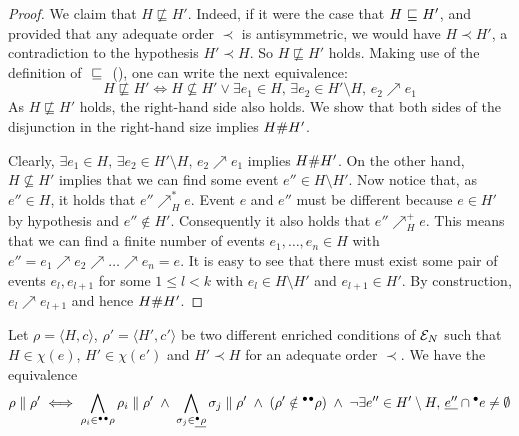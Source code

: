 \begin{proof}
We claim that $H \not\sqsubseteq H'$.  Indeed, if it were the case that $H
{\ \sqsubseteq \ } H'$, and provided that any adequate order $\prec$ is antisymmetric, we
would have $H \prec H'$, a contradiction to the hypothesis $H' \prec H$.  So $H
\not\sqsubseteq H'$ holds.  Making use of the definition of ${\ \sqsubseteq \ }$
(), one can write the next equivalence: $$H \not\sqsubseteq
H' \iff H \not\subseteq H' \lor \exists e_1 \in H,\, \exists e_2 \in H'
\setminus H,\, e_2 \nearrow e_1$$  As $H \not\sqsubseteq H'$ holds, the
right-hand side also holds.  We show that both sides of the disjunction in the
right-hand size implies $H \mathord{\#} H'$.

Clearly, $\exists e_1 \in H,\, \exists e_2 \in H' \setminus H,\, e_2 \nearrow
e_1$ implies $H \mathord{\#} H'$.  On the other hand, $H \not\subseteq H'$ implies
that we can find some event $e'' \in H \setminus H'$.  Now notice that, as $e''
\in H$, it holds that $e'' \nearrow^*_H e$.  Event $e$ and $e''$ must be
different because $e \in H'$ by hypothesis and $e'' \notin H'$.  Consequently
it also holds that $e'' \nearrow^+_H e$.  This means that we can find a finite
number of events $e_1, \ldots, e_n \in H$ with $e'' = e_1 \nearrow e_2 \nearrow
\ldots \nearrow e_n = e$.  It is easy to see that there must exist some pair of
events $e_l, e_{l+1}$ for some $1 \le l < k$ with $e_l \in H \setminus H'$ and
$e_{l+1} \in H'$.  By construction, $e_l \nearrow e_{l+1}$ and hence $H \mathord{\#}
H'$.
\end{proof}

\setcounter{theorem}{16}
\begin{theorem}
Let $\rho = \langle H, c \rangle$, $\rho' = \langle H', c' \rangle$ be two
different enriched conditions of $\mathcal{E}_{N}$ such that $H \in \chi(e)$, $H' \in
\chi(e')$ and $H' \prec H$ for an adequate order $\prec$.  We have the
equivalence $$\rho \parallel \rho' \iff \bigwedge_{\rho_i \in {}^\bullet{}^\bullet\rho}
\rho_i \parallel \rho' \; \land \; \bigwedge_{\sigma_j \in \underline{{}^\bullet\rho}}
\sigma_j \parallel \rho' \; \land \; (\rho' \notin {}^\bullet{}^\bullet\rho) \; \land \;
\lnot \exists e'' \in H' \setminus H,\, \underline{e''} \cap {}^\bullet e \not=
\emptyset$$
\end{theorem}

